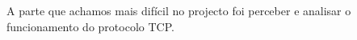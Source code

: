 \documentclass[11pt,a4paper,reqno]{report}
\numberwithin{equation}{section}
\begin{document}
A parte que achamos mais difícil no projecto foi perceber e analisar o funcionamento do protocolo TCP.





\end{document}
